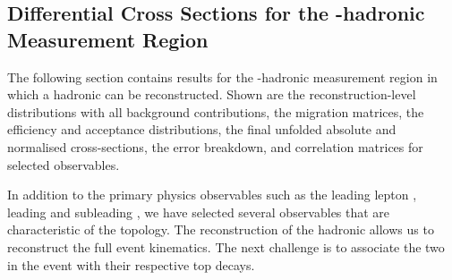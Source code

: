 %
%
%
%
%
\subsection{Differential Cross Sections for the \texorpdfstring{\Wboson}{W}-hadronic Measurement Region}
\label{sec:results:wbwb}

The following section contains results for the \Wboson-hadronic measurement region in which a hadronic \Wboson can be reconstructed. Shown are the reconstruction-level distributions with all background contributions, the migration matrices, the efficiency and acceptance distributions, the final unfolded absolute and normalised cross-sections, the error breakdown, and correlation matrices for selected observables.

In addition to the primary physics observables such as the leading lepton \pt, leading and subleading \bjet \pt, we have selected several observables that are characteristic of the \WbWb topology. The reconstruction of the hadronic \Wboson allows us to reconstruct the full event kinematics. The next challenge is to associate the two \bjets in the event with their respective top decays.

